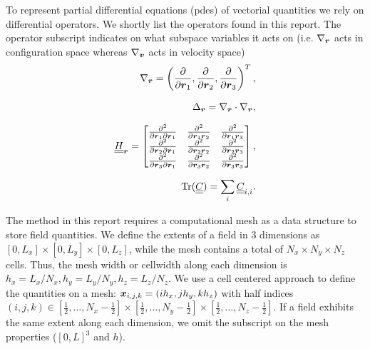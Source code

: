 To represent partial differential equations (\gls{pde}s) of vectorial quantities we rely on differential
operators.
We shortly list the operators found in this report.
The operator subscript indicates on what subspace variables it acts on (i.e. $\nabla_{\boldsymbol{r}}$ acts in
configuration space whereas $\nabla_{\boldsymbol{v}}$ acts in velocity space)
\begin{align}
    \begin{split}
    \label{eq:diffGrad}
    \posNabla = \left( \frac{\partial}{\partial \vect r_1}, \frac{\partial}{\partial \vect r_2},
    \frac{\partial}{\partial \vect r_3} \right)^T, %
    \end{split}
    \eqVspace
    \begin{split}
    \label{eq:diffDiv}
    \Delta_{\vect r} = \posNabla \cdot \posNabla,
    \end{split}
    \eqVspace
    \begin{split}
    \label{eq:diffHess}
    \matr H_{\vect r} = 
        \begin{bmatrix}
            \frac{\partial^2}{\partial \vect r_1 \partial \vect r_1} & \frac{\partial^2}{\partial \vect r_1 \vect r_2} & \frac{\partial^2}{\partial \vect r_1 \vect r_3} \\
            \frac{\partial^2}{\partial \vect r_2 \partial \vect r_1} & \frac{\partial^2}{\partial \vect r_2 \vect r_2} & \frac{\partial^2}{\partial \vect r_2 \vect r_3} \\
            \frac{\partial^2}{\partial \vect r_3 \partial \vect r_1} & \frac{\partial^2}{\partial \vect r_3 \vect r_2} & \frac{\partial^2}{\partial \vect r_3 \vect r_3}
        \end{bmatrix},
    \end{split}
    \eqVspace
    \begin{split}
        \text{Tr}(\matr C) = \sum_i \matr C_{i,i}.
    \end{split}
\end{align}

The method in this report requires a computational mesh as a data structure to store field
quantities.
We define the extents of a field in 3 dimensions as $[0,L_x] \times [0,L_y] \times [0, L_z]$, while the mesh
contains a total of $N_x \times N_y \times N_z$ cells. Thus, the mesh width
or cellwidth along each dimension is $h_x = L_x / N_x,h_y = L_y / N_y, h_z = L_z / N_z$. 
We use a cell centered approach to define the quantities on a mesh: $\boldsymbol{x}_{i,j,k} = (ih_x, jh_y, kh_z)$
with half indices $(i,j,k) \in [\frac{1}{2},\dots,N_x-\frac{1}{2}] \times
[\frac{1}{2},\dots,N_y-\frac{1}{2}] \times [\frac{1}{2},\dots,N_z-\frac{1}{2}]$.
If a field exhibits the same extent along each dimension, we omit the subscript on the mesh
properties ($[0,L]^3$ and $h$).

